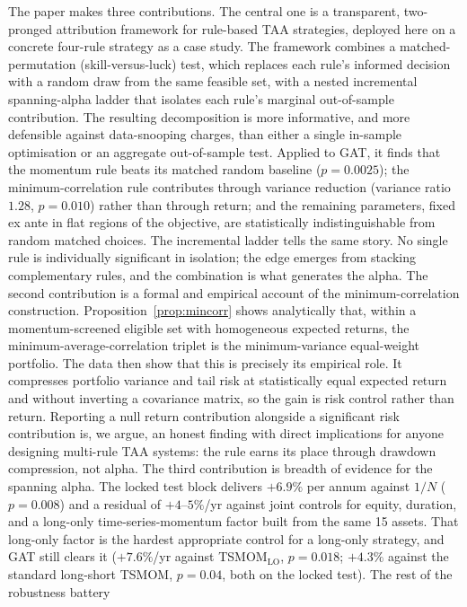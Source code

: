 The paper makes three contributions.
The central one is a transparent, two-pronged attribution
framework for rule-based TAA strategies, deployed here on a concrete four-rule
strategy as a case study. The framework combines a matched-permutation
(skill-versus-luck) test, which replaces each rule's informed decision with a random
draw from the same feasible set, with a nested incremental spanning-alpha ladder
that isolates each rule's marginal out-of-sample contribution. The resulting
decomposition is more informative, and more defensible against
data-snooping charges, than either a single in-sample optimisation or an aggregate
out-of-sample test. Applied to GAT, it finds that the momentum rule beats its
matched random baseline ($p = 0.0025$); the minimum-correlation rule contributes
through variance reduction (variance ratio $1.28$, $p = 0.010$) rather than
through return; and the remaining parameters, fixed ex ante in flat regions of the
objective, are statistically indistinguishable from random matched choices. The
incremental ladder tells the same story. No single rule is individually significant
in isolation; the edge emerges from stacking complementary rules, and the
combination is what generates the alpha.
The second contribution is a formal and empirical account of the minimum-correlation
construction. Proposition~\ref{prop:mincorr} shows analytically that, within a
momentum-screened eligible set with homogeneous expected returns, the
minimum-average-correlation triplet is the minimum-variance equal-weight portfolio.
The data then show that this is precisely its empirical role. It compresses
portfolio variance and tail risk at statistically equal expected
return and without inverting a covariance matrix, so the gain is risk control rather
than return. Reporting a null return contribution
alongside a significant risk contribution is, we argue, an honest finding with direct
implications for anyone designing multi-rule TAA systems: the rule earns its
place through drawdown compression, not alpha.
The third contribution is breadth of evidence for the spanning alpha.
The locked test block delivers $+6.9\%$ per annum against $1/N$ ($p = 0.008$) and
a residual of $+4$--$5\%$/yr against joint controls for equity, duration, and a
long-only time-series-momentum factor built from the same 15 assets. That long-only
factor is the hardest appropriate control for a long-only strategy, and GAT still
clears it ($+7.6\%$/yr against
TSMOM$_{\text{LO}}$, $p = 0.018$; $+4.3\%$ against the standard long-short
TSMOM, $p = 0.04$, both on the locked test). The rest of the robustness battery
